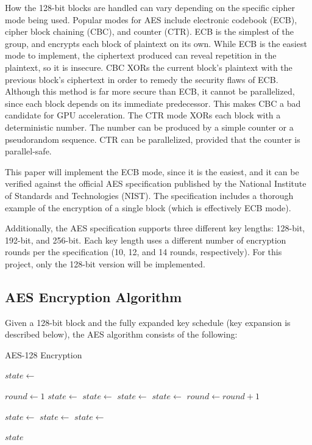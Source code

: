 \documentclass[a4paper,10pt,conference]{IEEEtran}
\begin{document}
How the 128-bit blocks are handled can vary depending on the specific cipher mode being used.  Popular modes for AES include electronic codebook (ECB), cipher block chaining (CBC), and counter (CTR)\cite{intel}.  ECB is the simplest of the group, and encrypts each block of plaintext on its own.  While ECB is the easiest mode to implement, the ciphertext produced can reveal repetition in the plaintext, so it is insecure.  CBC XORs the current block's plaintext with the previous block's ciphertext in order to remedy the security flaws of ECB.  Although this method is far more secure than ECB, it cannot be parallelized, since each block depends on its immediate predecessor.  This makes CBC a bad candidate for GPU acceleration.  The CTR mode XORs each block with a deterministic number.  The number can be produced by a simple counter or a pseudorandom sequence.  CTR can be parallelized, provided that the counter is parallel-safe.

This paper will implement the ECB mode, since it is the easiest, and it can be verified against the official AES specification published by the National Institute of Standards and Technologies (NIST).  The specification includes a thorough example of the encryption of a single block (which is effectively ECB mode).

Additionally, the AES specification supports three different key lengths: 128-bit, 192-bit, and 256-bit.  Each key length uses a different number of encryption rounds per the specification (10, 12, and 14 rounds, respectively).  For this project, only the 128-bit version will be implemented.

\subsection{AES Encryption Algorithm}

Given a 128-bit block and the fully expanded key schedule (key expansion is described below), the AES algorithm consists of the following\cite{nist}:

\begin{algorithm}
\caption{AES-128 Encryption}
\begin{algorithmic}[1]

\State $state\gets$ 

\State $round\gets 1$
    \State $state\gets$ 
    \State $state\gets$ 
    \State $state\gets$ 
    \State $state\gets$ 
    \State $round\gets round + 1$
\EndWhile

\State $state\gets$ 
\State $state\gets$ 
\State $state\gets$ 

\State \Return $state$
\EndFunction
\end{algorithmic}
\end{algorithm}
\end{document}
